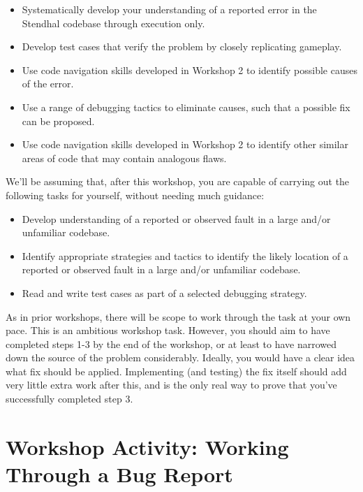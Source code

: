 \documentclass[
]{book}
\providecommand{\tightlist}{%
  \setlength{\itemsep}{0pt}\setlength{\parskip}{0pt}}
\begin{document}
\begin{itemize}
\tightlist
\item
  Systematically develop your understanding of a reported error in the Stendhal codebase through execution only.
\item
  Develop test cases that verify the problem by closely replicating gameplay.
\item
  Use code navigation skills developed in Workshop 2 to identify possible causes of the error.
\item
  Use a range of debugging tactics to eliminate causes, such that a possible fix can be proposed.
\item
  Use code navigation skills developed in Workshop 2 to identify other similar areas of code that may contain analogous flaws.
\end{itemize}

We'll be assuming that, after this workshop, you are capable of carrying out the following tasks for yourself, without needing much guidance:

\begin{itemize}
\tightlist
\item
  Develop understanding of a reported or observed fault in a large and/or unfamiliar codebase.
\item
  Identify appropriate strategies and tactics to identify the likely location of a reported or observed fault in a large and/or unfamiliar codebase.
\item
  Read and write test cases as part of a selected debugging strategy.
\end{itemize}

As in prior workshops, there will be scope to work through the task at your own pace. This is an ambitious workshop task. However, you should aim to have completed steps 1-3 by the end of the workshop, or at least to have narrowed down the source of the problem considerably. Ideally, you would have a clear idea what fix should be applied. Implementing (and testing) the fix itself should add very little extra work after this, and is the only real way to prove that you've successfully completed step 3.

\hypertarget{workshop-activity-working-through-a-bug-report}{%
\section{Workshop Activity: Working Through a Bug Report}\label{workshop-activity-working-through-a-bug-report}}
\end{document}
